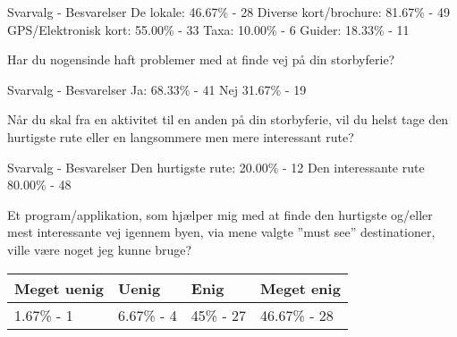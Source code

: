 Svarvalg - Besvarelser\newline
De lokale:
46.67\%  -  28 \newline
Diverse kort/brochure:
81.67\%  -  49 \newline
GPS/Elektronisk kort:
55.00\%  -  33 \newline
Taxa:
10.00\%  -   6 \newline
Guider:
18.33\% - 11 \newline


Har du nogensinde haft problemer med at finde vej på din storbyferie?

Svarvalg - Besvarelser \newline
Ja: 
68.33\%  -  41 \newline
Nej
31.67\%  -  19

Når du skal fra en aktivitet til en anden på din storbyferie, vil du helst tage den hurtigste rute eller en langsommere men mere interessant rute?

Svarvalg - Besvarelser \newline
Den hurtigste rute:
20.00\%  -  12 \newline
Den interessante rute
80.00\%  -  48 

Et program/applikation, som hjælper mig med at finde den hurtigste og/eller mest interessante vej igennem byen, via mene valgte ”must see” destinationer, ville være noget jeg kunne bruge? \newline

\begin{center}
	\begin{tabular}{| l | l | l | l |}
    \hline
    Meget uenig & Uenig & Enig & Meget enig \\ \hline
    1.67\% - 1 & 6.67\% - 4 & 45\% - 27 & 46.67\% - 28 \\
    \hline
    \end{tabular}
\end{center}
